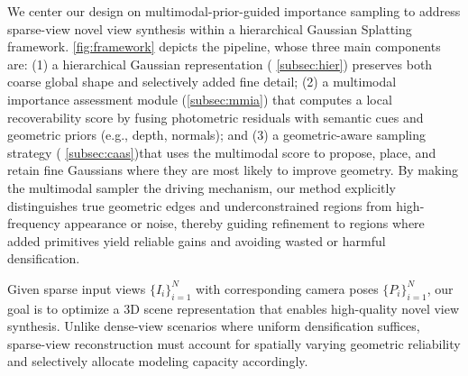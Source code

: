 \documentclass{article}
\begin{document}
  
  
  We center our design on multimodal-prior-guided importance sampling to address sparse-view novel view synthesis within a hierarchical Gaussian Splatting framework. \cref{fig:framework} depicts the pipeline, whose three main components are: (1) a hierarchical Gaussian representation ( \cref{subsec:hier}) preserves both coarse global shape and selectively added fine detail; (2) a multimodal importance assessment module (\cref{subsec:mmia}) that computes a local recoverability score by fusing photometric residuals with  semantic cues and geometric priors (e.g., depth, normals); and (3) a geometric-aware sampling strategy ( \cref{subsec:caas})that uses the multimodal score to propose, place, and retain fine Gaussians where they are most likely to improve geometry. By making the multimodal sampler the driving mechanism, our method explicitly distinguishes true geometric edges and underconstrained regions from high-frequency appearance or noise, thereby guiding refinement to regions where added primitives yield reliable gains and avoiding wasted or harmful densification.
  
  Given sparse input views $\{I_i\}_{i=1}^N$ with corresponding camera poses $\{P_i\}_{i=1}^N$, our goal is to optimize a 3D scene representation that enables high-quality novel view synthesis. Unlike dense-view scenarios where uniform densification suffices, sparse-view reconstruction must account for spatially varying geometric reliability and selectively allocate modeling capacity accordingly.
  
\end{document}
